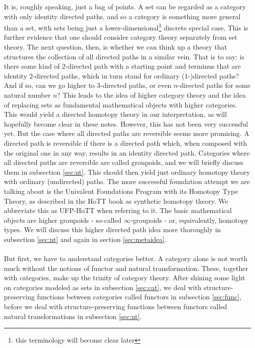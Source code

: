 It is, roughly speaking, just a bag of points.
A set can be regarded as a category with only identity directed paths, and so a category is something more general than a set, with sets being just a lower-dimensional\footnote{this terminology will become clear later} discrete special case.
This is further evidence that one should consider category theory separately from set theory.
The next question, then, is whether we can think up a theory that structures the collection of all directed paths in a similar vein.
That is to say: is there some kind of 2-directed path with a starting point and terminus that are identity 2-directed paths, which in turn stand for ordinary ($1$-)directed paths?
And if so, can we go higher to $3$-directed paths, or even $n$-directed paths for some natural number $n$?
This leads to the idea of higher category theory and the idea of replacing sets as fundamental mathematical objects with higher categories.
This would yield a {\glqq}directed homotopy theory{\glqq} in our interpretation, as will hopefully become clear in these notes.
However, this has not been very successful yet.
But the case where all directed paths are reversible seems more promising.
A directed path is reversible if there is a directed path which, when composed with the original one in any way, results in an identity directed path.
Categories where all directed paths are reversible are called groupoids, and we will briefly discuss them in subsection \ref{sec:nt}.
This should then yield just ordinary homotopy theory with ordinary (undirected) paths.
The more successful foundation attempt we are talking about is the Univalent Foundations Program with its Homotopy Type Theory, as described in the HoTT book \cite{1ba1603e} as {\glqq}synthetic{\grqq} homotopy theory.
We abbreviate this as UFP-HoTT when referring to it.
The basic mathematical objects are higher groupoids - so-called $\infty$-groupoids - or, equivalently, homotopy types.
We will discuss this higher directed path idea more thoroughly in subsection \ref{sec:nt} and again in section \ref{sec:metaidea}.
\\\\
But first, we have to understand categories better.
A category alone is not worth much without the notions of functor and natural transformation.
These, together with categories, make up the trinity of category theory.
After shining some light on categories modeled as sets in subsection \ref{sec:cat}, we deal with structure-preserving functions between categories called functors in subsection \ref{sec:func}, before we deal with structure-preserving functions between functors called natural transformations in subsection \ref{sec:nt}.
